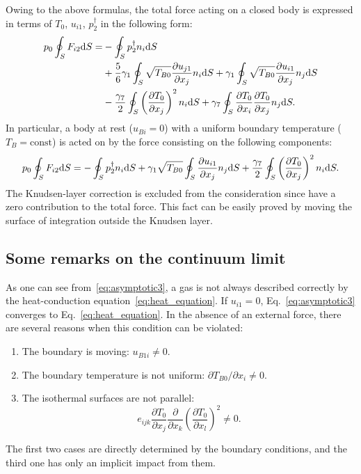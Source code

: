 \documentclass[smallextended]{svjour3} %
\newcommand{\dd}{\mathrm{d}}
\newcommand{\pder}[2][]{\frac{\partial#1}{\partial#2}}
\newcommand{\Pder}[2][]{\partial#1/\partial#2}
\begin{document}
Owing to the above formulas, the total force acting on a closed body
is expressed in terms of \(T_0\), \(u_{i1}\), \(p^\dag_2\) in the following form:
\begin{align}\label{eq:force:terms_general}
    p_0 \oint_S F_{i2} \dd{S} =
        &- \oint_S p_2^\dag n_i \dd{S} \notag\\
        &+ \frac{5}{6}\gamma_1 \oint_S \sqrt{T_{B0}} \pder[u_{j1}]{x_j} n_i \dd{S}
        + \gamma_1 \oint_S \sqrt{T_{B0}} \pder[u_{i1}]{x_j} n_j \dd{S} \notag\\
        &- \frac{\gamma_7}{2} \oint_S \left(\pder[T_0]{x_j}\right)^2 n_i \dd{S}
        + \gamma_7 \oint_S \pder[T_0]{x_i}\pder[T_0]{x_j} n_j \dd{S}.
\end{align}
In particular, a body at rest (\(u_{Bi} =0 \)) with a uniform boundary temperature (\(T_B = \mathrm{const}\))
is acted on by the force consisting on the following components:
\begin{equation}\label{eq:force:terms}
    p_0 \oint_S F_{i2} \dd{S} =
        - \oint_S p_2^\dag n_i \dd{S} \\
        + \gamma_1 \sqrt{T_{B0}} \oint_S \pder[u_{i1}]{x_j} n_j \dd{S}
        + \frac{\gamma_7}{2} \oint_S \left(\pder[T_0]{x_j}\right)^2 n_i \dd{S}.
\end{equation}
The Knudsen-layer correction is excluded from the consideration since have a zero contribution to the total force.
This fact can be easily proved by moving the surface of integration outside the Knudsen layer.

\subsection{Some remarks on the continuum limit}

As one can see from~\eqref{eq:asymptotic3}, a gas is not always described correctly
by the heat-conduction equation~\eqref{eq:heat_equation}.
If \(u_{i1} = 0\), Eq.~\eqref{eq:asymptotic3} converges to Eq.~\eqref{eq:heat_equation}.
In the absence of an external force, there are several reasons when this condition can be violated:
\begin{enumerate}
    \item The boundary is moving: \(u_{B1i} \neq 0 \).
    \item The boundary temperature is not uniform: \(\Pder[T_{B0}]{x_i} \neq 0 \).
    \item The isothermal surfaces are not parallel:
        \begin{equation}\label{eq:equilibrium}
            e_{ijk}\pder[T_0]{x_j}\pder{x_k}\left(\pder[T_0]{x_l}\right)^2 \neq 0.
        \end{equation}
\end{enumerate}
The first two cases are directly determined by the boundary conditions,
and the third one has only an implicit impact from them.
\end{document}
